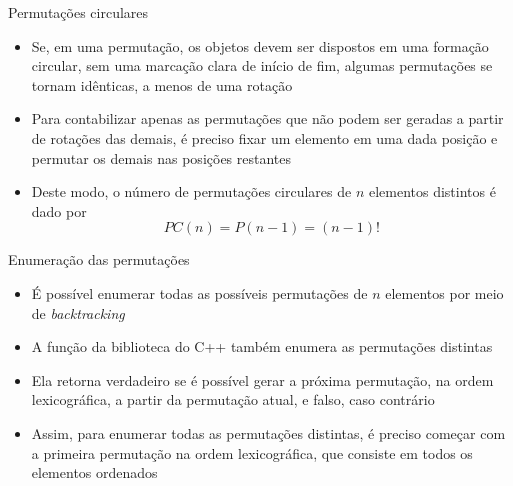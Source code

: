 \begin{frame}[fragile]{Permutações circulares}

    \begin{itemize}
        \item Se, em uma permutação, os objetos devem ser dispostos em uma formação circular, sem uma marcação clara 
            de início de fim, algumas permutações se tornam idênticas, a menos de uma rotação

        \item Para contabilizar apenas as permutações que não podem ser geradas a partir de rotações das demais, 
            é preciso fixar um elemento em uma dada posição e permutar os demais nas posições restantes

        \item Deste modo, o número de permutações circulares de $n$ elementos distintos é dado por
$$
    PC(n) = P(n - 1) = (n - 1)!
$$
    \end{itemize}

\end{frame}

\begin{frame}[fragile]{Enumeração das permutações}

    \begin{itemize}
        \item É possível enumerar todas as possíveis permutações de $n$ elementos por meio de \textit{backtracking}

        \item A função  da biblioteca  do C++ também enumera as 
            permutações distintas

        \item Ela retorna verdadeiro se é possível gerar a próxima permutação, na ordem lexicográfica, a partir da 
            permutação atual, e falso, caso contrário

        \item Assim, para enumerar todas as permutações distintas, é preciso começar com a primeira permutação na 
            ordem lexicográfica, que consiste em todos os elementos ordenados
    \end{itemize}

\end{frame}

